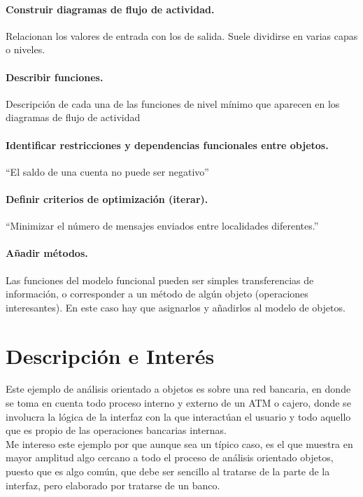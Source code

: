\documentclass[spanish,12pt,letterpapper]{article}
\begin{document}
	\paragraph{Construir diagramas de flujo de actividad.} Relacionan los valores de entrada con los de salida. Suele dividirse en varias capas o niveles.
	\paragraph{Describir funciones.} Descripción de cada una de las funciones de nivel mínimo que aparecen en los diagramas de flujo de actividad
		\paragraph{Identificar restricciones y dependencias funcionales entre objetos.}``El saldo de una cuenta no puede ser negativo''
	\paragraph{Definir criterios de optimización (iterar).} ``Minimizar el número de mensajes enviados entre localidades diferentes.''
	\paragraph{Añadir métodos.} Las funciones del modelo funcional pueden ser simples transferencias de información, o corresponder a un método de algún objeto (operaciones interesantes). En este caso hay que asignarlos y añadirlos al modelo de objetos.\\
	
	\section{Descripción e Interés}
	Este ejemplo de análisis orientado a objetos es sobre una red bancaria, en donde se toma en cuenta todo proceso interno y externo de un ATM o cajero, donde se involucra la lógica de la interfaz con la que interactúan el usuario y todo aquello que es propio de las operaciones bancarias internas.\\
	
	Me intereso este ejemplo por que aunque sea un típico caso, es el que muestra en mayor amplitud algo cercano a todo el proceso de análisis orientado objetos, puesto que es algo común, que debe ser sencillo al tratarse de la parte de la interfaz, pero elaborado por tratarse de un banco.
	
	\pagebreak
\end{document}
